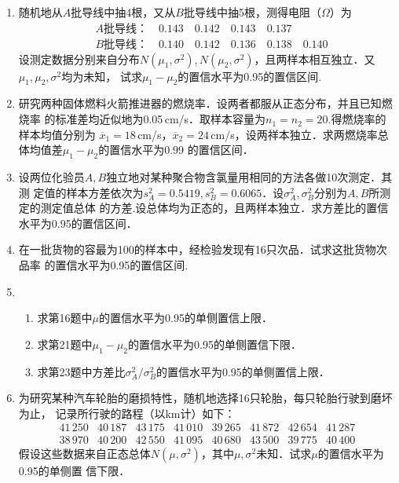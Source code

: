 \documentclass[10pt,a4paper]{article}
\begin{document}
\begin{enumerate}
    \item 随机地从$A$批导线中抽4根，又从$B$批导线中抽5根，测得电阻（$\Omega$）为
    \begin{equation}
        \begin{split}
            & A\mbox{批导线：} \quad  0.143 \quad 0.142 \quad 0.143 \quad 0.137\\
            & B\mbox{批导线：} \quad  0.140 \quad 0.142 \quad 0.136 \quad 0.138 \quad 0.140
        \end{split}
        \nonumber
    \end{equation}
    设测定数据分别来自分布$N(\mu_1,\sigma^2),N(\mu_2,\sigma^2)$，且两样本相互独立．又$\mu_1,\mu_2,\sigma^2$均为未知，
    试求$\mu_1-\mu_2$的置信水平为0.95的置信区间.




    \item 研究两种固体燃料火箭推进器的燃烧率．设两者都服从正态分布，并且已知燃烧率
    的标准差均近似地为0.05$\, $cm/s．取样本容量为$n_1=n_2=20$.得燃烧率的样本均值分别为
    $\overline{x}_1=18\, $cm/s，$\overline{x}_2=24\, $cm/s，设两祥本独立．求两燃烧率总体均值差$\mu_1-\mu_2$的置信水平为0.99
    的置信区间．




    \item 设两位化验员$A, B$独立地对某种聚合物含氯量用相同的方法各做10次测定．其测
    定值的样本方差依次为$s_A^2=0.5419,s_B^2=0.6065$．设$\sigma_A^2,\sigma_B^2$分别为$A,B$所测定的测定值总体
    的方差.设总体均为正态的，且两样本独立．求方差比的置信水平为0.95的置信区间．


    \item 在一批货物的容最为100的样本中，经检验发现有16只次品．试求这批货物次品率
    的置信水平为0.95的置信区间.




    \item \begin{enumerate}
        \item 求第16题中$\mu$的置信水平为0.95的单侧置信上限．
        \item 求第21题中$\mu_1-\mu_2$的置信水平为0.95的单侧置信下限．
        \item 求第23题中方差比$\sigma_A^2/\sigma_B^2$的置信水平为0.95的单侧置信上限．
    \end{enumerate}




    \item 为研究某种汽车轮胎的磨损特性，随机地选择16只轮胎，每只轮胎行驶到磨坏为止，
    记录所行驶的路程（以km计）如下：
    $$\begin{array}{cccccccc}
        41\, 250 & 40\, 187 & 43\, 175 & 41\, 010 & 39\, 265 & 41\, 872 & 42\, 654 & 41\, 287\\
        38\, 970 & 40\, 200 & 42\, 550 & 41\, 095 & 40\, 680 & 43\, 500 & 39\, 775 & 40\, 400 
    \end{array}$$
    假设这些数据来自正态总体$N(\mu,\sigma^2)$，其中$\mu,\sigma^2$未知．试求$μ$的置信水平为0.95的单侧置
    信下限．




\end{enumerate}
\end{document}
